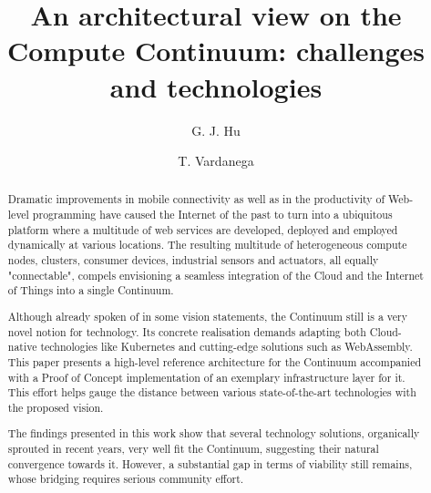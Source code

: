\documentclass{elsarticle}
\begin{document}
\begin{frontmatter}


\title{
An architectural view on the Compute Continuum: challenges and technologies
}

\author[1]{G. J. Hu}
\author[1]{T. Vardanega}
\address[1]{Department of Mathematics, University of Padova, Italy}

\begin{abstract}
Dramatic improvements in mobile connectivity as well as in the productivity of Web-level programming have caused the Internet of the past to turn into a ubiquitous platform where a multitude of web services are developed, deployed and employed dynamically at various locations. 
The resulting multitude of heterogeneous compute nodes, clusters, consumer devices, industrial sensors and actuators, all equally "connectable", compels envisioning a seamless integration of the Cloud and the Internet of Things into a single Continuum.\par
Although already spoken of in some vision statements, the Continuum still is a very novel notion for technology. Its concrete realisation demands adapting both Cloud-native technologies like Kubernetes and cutting-edge solutions such as WebAssembly. This paper presents a high-level reference architecture for the Continuum accompanied with a Proof of Concept implementation of an exemplary infrastructure layer for it. This effort helps gauge the distance between various state-of-the-art technologies with the proposed vision.\par
The findings presented in this work show that several technology solutions, organically sprouted in recent years, very well fit the Continuum, suggesting their natural convergence towards it. However, a substantial gap in terms of viability still remains, whose bridging requires serious community effort.
\end{abstract}



\end{frontmatter}
\end{document}
